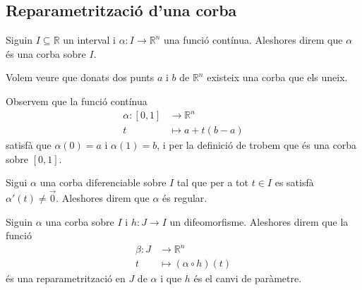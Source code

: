 \documentclass[../../Main.tex]{subfiles}
\begin{document}
	\subsection{Reparametrització d'una corba}
	\begin{definition}[Corba]
		\label{def:corba}
		Siguin \(I\subseteq\mathbb{R}\) un interval i \(\alpha\colon I\longrightarrow\mathbb{R}^{n}\) una funció contínua. Aleshores direm que \(\alpha\) és una corba sobre \(I\).
	\end{definition}
	\begin{example}
		\label{ex:corba que uniex dos punts}
		Volem veure que donats dos punts \(a\) i \(b\) de \(\mathbb{R}^{n}\) existeix una corba que els uneix.
		\begin{solution}
			Observem que la funció contínua %
			\begin{align*}
				\alpha\colon[0,1]&\longrightarrow\mathbb{R}^{n} \\
				t&\longmapsto a+t(b-a)
			\end{align*}
			satisfà que \(\alpha(0)=a\) i \(\alpha(1)=b\), i per la definició de  trobem que és una corba sobre \([0,1]\).
		\end{solution}
	\end{example}
	\begin{definition}
		\label{def:corba regular}
		Sigui \(\alpha\) una corba diferenciable sobre \(I\) tal que per a tot \(t\in I\) es satisfà \(\alpha'(t)\neq\vec{0}\). Aleshores direm que \(\alpha\) és regular.
	\end{definition}
	\begin{definition}[Reparametrització]
		\label{def:reparametrització d'una corba}
		\label{def:canvi de paràmetre}
		Siguin \(\alpha\) una corba sobre \(I\) i \(h\colon J\longrightarrow I\) un difeomorfisme. Aleshores direm que la funció
		\begin{align*}
			\beta\colon J&\longrightarrow\mathbb{R}^{n} \\
			t&\longmapsto(\alpha\circ h)(t)
		\end{align*}
		és una reparametrització en \(J\) de \(\alpha\) i que \(h\) és el canvi de paràmetre.
	\end{definition}
\end{document}
